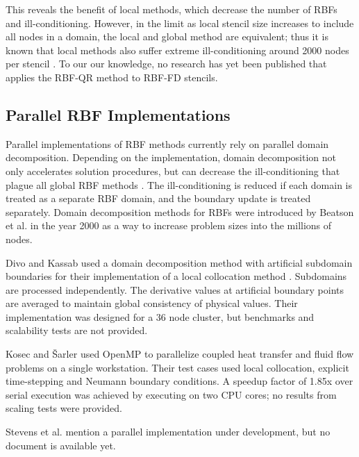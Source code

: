 \documentclass{report}
\begin{document}
{This reveals the benefit of local methods, which decrease the number of RBFs and ill-conditioning. However, in the limit as local stencil size increases to include all nodes in a domain, the local and global method are equivalent; thus it is known that local methods also suffer extreme ill-conditioning around 2000 nodes per stencil \cite{Shu2006}. To our our knowledge, no research has yet been published that applies the RBF-QR method to RBF-FD stencils.


\subsection{Parallel RBF Implementations}

Parallel implementations of RBF methods currently rely on parallel domain decomposition. Depending on the implementation, domain decomposition not only accelerates solution procedures, but can decrease the ill-conditioning that plague all global RBF methods \cite{Divo2007}. The ill-conditioning is reduced if each domain is treated as a separate RBF domain, and the boundary update is treated separately. Domain decomposition methods for RBFs were introduced by Beatson et al. \cite{Beatson2000} in the year 2000 as a way to increase problem sizes into the millions of nodes.

Divo and Kassab \cite{Divo2007} used a domain decomposition method with artificial 
subdomain boundaries for their implementation of a local collocation method \cite{Divo2007}. 
Subdomains are processed independently. The derivative values 
at artificial boundary points are averaged to maintain global consistency of physical values. Their implementation 
was designed for a 36 node cluster, but benchmarks and scalability tests are not provided.


Kosec and \v{S}arler \cite{Kosec2008} used OpenMP to parallelize coupled heat transfer 
and fluid flow problems on a single workstation. 
Their test cases used local collocation, explicit time-stepping and Neumann boundary conditions. A speedup 
factor of 1.85x over serial execution was achieved by executing on two CPU cores; no 
results from scaling tests were provided. 

Stevens et al. \cite{Stevens2009a} mention a parallel implementation under development, but no document is available yet. 

}
\end{document}
